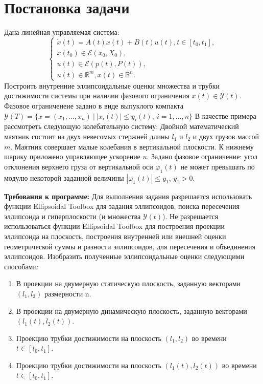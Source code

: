 \documentclass[12pt]{article}
\begin{document}
\section{Постановка задачи}
    		Дана линейная управляемая система:
    		$$
    			\begin{cases}
    				\dot{x}(t) = A(t) x(t) + B(t) u(t), t \in [t_0, t_1], \\
    				x(t_0) \in \mathcal{E}(x_0, X_0), \\
    				u(t) \in \mathcal{E} (p(t), P(t)), \\
    				u(t) \in \mathbb{R}^m, x(t) \in \mathbb{R}^n. 
    			\end{cases}
    		$$
		Построить внутренние эллипсоидальные оценки множества и трубки достижимости системы при наличии фазового ограничения $x(t) \in \mathcal{Y}(t)$. Фазовое ограниченеие задано в виде выпуклого компакта $\mathcal{Y}(T) = \{x = (x_1, \ldots, x_n)\ |\ |x_i(t)| \leqslant y_i(t), \ i = 1, \ldots, n \}$
    		В качестве примера рассмотреть следующую колебательную систему:
       	Двойной математический маятник состоит из двух невесомых стержней длины $l_1$ и $l_2$ и двух грузов массой $m$. Маятник совершает малые колебания в вертикальной плоскости. К нижнему шарику приложено управляющее ускорение $u$. 
		Задано фазовое ограничение: угол отклонения верхнего груза от вертикальной оси $\varphi_1(t)$ не может превышать по модулю некоторой заданной величины $|\varphi_1(t)| \leqslant y_1$, $y_1 > 0$.

		\textbf{Требования к программе:}
			Для выполнения задания разрешается использовать функции Ellipsoidal Toolbox для задания эллипсоидов, поиска пересечения эллипсоида и гиперплоскости (и множества $\mathcal{Y}(t)$). Не разрешается использоваться функции Ellipsoidal Toolbox для построения проекции эллипсоида на плоскость, построения внутренней или внешней оценки геометрической суммы и разности эллипсоидов, для пересечения и объединения эллипсоидов.
			Изобразить полученные эллипсоидальные оценки следующими способами:
			\begin{enumerate}
				\item В проекции на двумерную статическую плоскость, заданную векторами $(l_1, l_2)$ размерности n.
				\item В проекции на двумерную динамическую плоскость, заданную векторами $(l_1(t), l_2(t))$.
				\item Проекцию трубки достижимости на плоскость $(l_1, l_2)$ во времени $t \in [t_0, t_1]$.
				\item Проекцию трубки достижимости на плоскость $(l_1(t), l_2(t))$ во времени $t \in [t_0, t_1]$.
			\end{enumerate}
			
\end{document}
